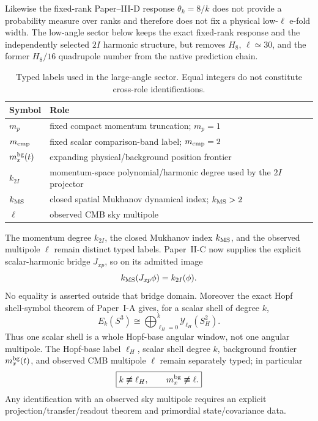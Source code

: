 \documentclass[12pt,a4paper]{article}
\begin{document}
Likewise the fixed-rank Paper--III-D response \(\theta_k=8/k\) does not
provide a probability measure over ranks and therefore does not fix a physical
low-\(\ell\) e-fold width.  The low-angle sector below keeps the exact
fixed-rank response and the independently selected \(2I\) harmonic structure,
but removes \(H_8\), \(\ell\simeq30\), and the former \(H_8/16\) quadrupole
number from the native prediction chain.

\begin{table}[ht]
\centering
\caption{Typed labels used in the large-angle sector.  Equal integers do not
constitute cross-role identifications.}
\label{p8:tab:v191-lowell-typed-labels}
\begin{tabular}{ll}
\toprule
Symbol & Role\\
\midrule
$m_p$ & fixed compact momentum truncation; $m_p=1$\\
$m_{\rm cmp}$ & fixed scalar comparison-band label; $m_{\rm cmp}=2$\\
$m_x^{\rm bg}(t)$ & expanding physical/background position frontier\\
$k_{2I}$ & momentum-space polynomial/harmonic degree used by the $2I$ projector\\
$k_{\rm MS}$ & closed spatial Mukhanov dynamical index; $k_{\rm MS}>2$\\
$\ell$ & observed CMB sky multipole\\
\bottomrule
\end{tabular}
\end{table}

\begin{remark}
\label{p8:rem:v191-lowell-label-firewall}
The momentum degree $k_{2I}$, the closed Mukhanov index $k_{\rm MS}$, and the
observed multipole $\ell$ remain distinct typed labels.  Paper~II-C now
supplies the explicit scalar-harmonic bridge $J_{xp}$, so on its admitted
image
\[
 k_{\rm MS}(J_{xp}\phi)=k_{2I}(\phi).
\]
No equality is asserted outside that bridge domain.  Moreover the exact
Hopf shell-symbol theorem of Paper~I-A gives, for a scalar shell of degree
\(k\),
\[
 \boxed{E_k(S^3)\cong\bigoplus_{\ell_H=0}^{k}\mathscr Y_{\ell_H}(S_H^2).}
\]
Thus one scalar shell is a whole Hopf-base angular window, not one angular
multipole.  The Hopf-base label \(\ell_H\), scalar shell degree \(k\),
background frontier \(m_x^{\rm bg}(t)\), and observed CMB multipole \(\ell\)
remain separately typed; in particular
\[
 \boxed{k\not\equiv\ell_H,\qquad m_x^{\rm bg}\not\equiv\ell.}
\]
Any identification with an observed sky multipole requires an explicit
projection/transfer/readout theorem and primordial state/covariance data.
\end{remark}
\end{document}
